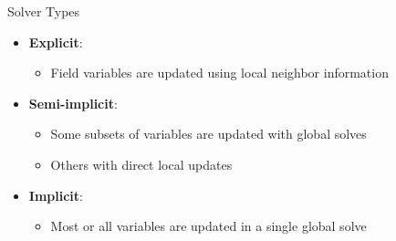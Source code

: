 \begin{frame}{Solver Types}

\begin{itemize}
  \item {\bf Explicit}:
  \begin{itemize}
    \item Field variables are updated using local neighbor information
  \end{itemize}

  \item {\bf Semi-implicit}:
  \begin{itemize}
    \item Some subsets of variables are updated with global solves
    \item Others with direct local updates
  \end{itemize}

  \item {\bf Implicit}:
  \begin{itemize}
    \item Most or all variables are updated in a single global solve
  \end{itemize}
\end{itemize}

\end{frame}

